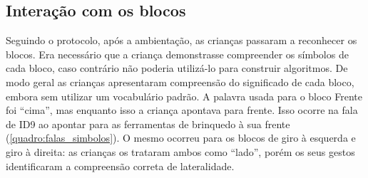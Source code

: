 \subsection{Interação com os blocos}

Seguindo o protocolo, após a ambientação, as crianças passaram a reconhecer os blocos. Era necessário que a criança demonstrasse compreender os símbolos de cada bloco, caso contrário não poderia utilizá-lo para construir algoritmos. De modo geral as crianças apresentaram compreensão do significado de cada bloco, embora sem utilizar um vocabulário padrão. A palavra usada para o bloco Frente foi “cima”, mas enquanto isso a criança apontava para frente. Isso ocorre na fala de ID9 ao apontar para as ferramentas de brinquedo à sua frente (\autoref{quadro:falas_simbolos}). O mesmo ocorreu para os blocos de giro à esquerda e giro à direita: as crianças os trataram ambos como “lado”, porém os seus gestos identificaram a compreensão correta de lateralidade.

